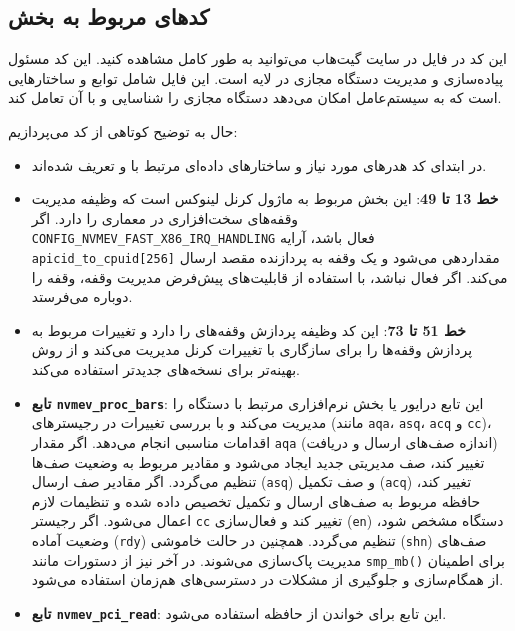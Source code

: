 \documentclass[12pt]{article}
\begin{document}
\subsection*{کدهای مربوط به بخش }
این کد در فایل \href{https://github.com/snu-csl/nvmevirt/blob/main/pci.c}{} در سایت گیت‌هاب  می‌توانید به طور کامل مشاهده کنید. این کد مسئول پیاده‌سازی و مدیریت دستگاه  مجازی در لایه  است. این فایل شامل توابع و ساختارهایی است که به سیستم‌عامل امکان می‌دهد دستگاه  مجازی را شناسایی و با آن تعامل کند.

حال به توضیح کوتاهی از کد می‌پردازیم:
\begin{itemize}
    \item در ابتدای کد هدرهای مورد نیاز و ساختارهای داده‌ای مرتبط با  و  تعریف شده‌اند.
    \item \textbf{خط 13 تا 49}: این بخش مربوط به ماژول کرنل لینوکس است که وظیفه مدیریت وقفه‌های سخت‌افزاری  در معماری  را دارد. اگر \texttt{CONFIG\_NVMEV\_FAST\_X86\_IRQ\_HANDLING} فعال باشد، آرایه \texttt{apicid\_to\_cpuid[256]} مقداردهی می‌شود و یک وقفه به پردازنده مقصد ارسال می‌کند. اگر فعال نباشد، با استفاده از قابلیت‌های پیش‌فرض مدیریت وقفه، وقفه را دوباره می‌فرستد.
    \item \textbf{خط 51 تا 73}: این کد وظیفه پردازش وقفه‌های  را دارد و تغییرات مربوط به پردازش وقفه‌ها را برای سازگاری با تغییرات  کرنل مدیریت می‌کند و از روش بهینه‌تر برای نسخه‌های جدیدتر استفاده می‌کند.
    \item \textbf{تابع \texttt{nvmev\_proc\_bars}}: این تابع درایور یا بخش نرم‌افزاری مرتبط با دستگاه  را مدیریت می‌کند و با بررسی تغییرات در رجیسترهای  (مانند \texttt{aqa}، \texttt{asq}، \texttt{acq} و \texttt{cc})، اقدامات مناسبی انجام می‌دهد. اگر مقدار \texttt{aqa} (اندازه صف‌های ارسال و دریافت) تغییر کند، صف مدیریتی جدید ایجاد می‌شود و مقادیر مربوط به وضعیت صف‌ها تنظیم می‌گردد. اگر مقادیر صف ارسال (\texttt{asq}) و صف تکمیل (\texttt{acq}) تغییر کند، حافظه مربوط به صف‌های ارسال و تکمیل تخصیص داده شده و تنظیمات لازم اعمال می‌شود. اگر رجیستر \texttt{cc} تغییر کند و فعال‌سازی (\texttt{en}) دستگاه مشخص شود، وضعیت آماده (\texttt{rdy}) تنظیم می‌گردد. همچنین در حالت خاموشی (\texttt{shn}) صف‌های مدیریت پاک‌سازی می‌شوند. در آخر نیز از دستورات مانند \texttt{smp\_mb()} برای اطمینان از همگام‌سازی و جلوگیری از مشکلات در دسترسی‌های هم‌زمان استفاده می‌شود.
    \item \textbf{تابع \texttt{nvmev\_pci\_read}}: این تابع برای خواندن از حافظه استفاده می‌شود.

\end{itemize}
\end{document}
